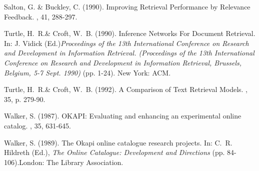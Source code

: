 \begin{thebibliography}{99}
Salton, G. \& Buckley, C. (1990).
\newblock Improving Retrieval Performance by Relevance Feedback.
,
41, 288-297.

Turtle, H.~R.\& Croft, W.~B. (1990).
\newblock Inference Networks For Document Retrieval.
\newblock In: J. Vidick (Ed.){\em Proceedings of the 13th International Conference on Research
and Development in Information Retrieval. (Proceedings of the 13th International
Conference on Research and Development in Information Retrieval, Brussels,
Belgium, 5-7 Sept. 1990)} (pp. 1-24). New York: ACM.

Turtle, H.~R.\& Croft, W.~B. (1992).
\newblock A Comparison of Text Retrieval Models.
, 35, p. 279-90.

Walker, S. (1987).
\newblock OKAPI: Evaluating and enhancing an experimental online catalog.
, 35, 631-645.

Walker, S. (1989).
\newblock The Okapi online catalogue research projects.
\newblock In: C.~R. Hildreth (Ed.),
{\em The Online Catalogue: Development and Directions}
(pp. 84-106).London: The Library Association.

\end{thebibliography}




